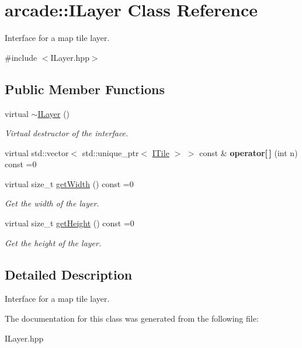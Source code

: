 \hypertarget{classarcade_1_1ILayer}{}\section{arcade\+:\+:I\+Layer Class Reference}
\label{classarcade_1_1ILayer}


Interface for a map tile layer.  




{\ttfamily \#include $<$I\+Layer.\+hpp$>$}

\subsection*{Public Member Functions}
\begin{DoxyCompactItemize}
\item 
\mbox{\label{classarcade_1_1ILayer_ac61832621733d6adc0bf5ac585643fa8}} 
virtual \hyperlink{classarcade_1_1ILayer_ac61832621733d6adc0bf5ac585643fa8}{$\sim$\+I\+Layer} ()
\begin{DoxyCompactList}\small\item\em Virtual destructor of the interface. \end{DoxyCompactList}\item 
\mbox{\label{classarcade_1_1ILayer_af444f3dca0e6e9976d00feb1ea41265f}} 
virtual std\+::vector$<$ std\+::unique\+\_\+ptr$<$ \hyperlink{classarcade_1_1ITile}{I\+Tile} $>$ $>$ const  \& {\bfseries operator\mbox{[}$\,$\mbox{]}} (int n) const =0
\item 
\mbox{\label{classarcade_1_1ILayer_ae80dc29ae33af872d7f531afe70bd7dd}} 
virtual size\+\_\+t \hyperlink{classarcade_1_1ILayer_ae80dc29ae33af872d7f531afe70bd7dd}{get\+Width} () const =0
\begin{DoxyCompactList}\small\item\em Get the width of the layer. \end{DoxyCompactList}\item 
\mbox{\label{classarcade_1_1ILayer_a79103ee447bda5c00edb8bef74e420fc}} 
virtual size\+\_\+t \hyperlink{classarcade_1_1ILayer_a79103ee447bda5c00edb8bef74e420fc}{get\+Height} () const =0
\begin{DoxyCompactList}\small\item\em Get the height of the layer. \end{DoxyCompactList}\end{DoxyCompactItemize}


\subsection{Detailed Description}
Interface for a map tile layer. 

The documentation for this class was generated from the following file\+:\begin{DoxyCompactItemize}
\item 
I\+Layer.\+hpp\end{DoxyCompactItemize}
